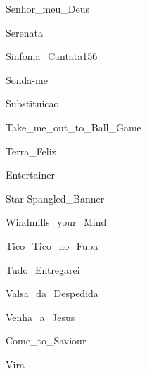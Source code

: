 \documentclass{scrartcl}
\begin{document}

{Senhor_meu_Deus}


{Serenata}


{Sinfonia_Cantata156}


{Sonda-me}


{Substituicao}


{Take_me_out_to_Ball_Game}


{Terra_Feliz}


{Entertainer}


{Star-Spangled_Banner}


{Windmills_your_Mind}


{Tico_Tico_no_Fuba}


{Tudo_Entregarei}


{Valsa_da_Despedida}


{Venha_a_Jesus}


{Come_to_Saviour}


{Vira}
\end{document}
